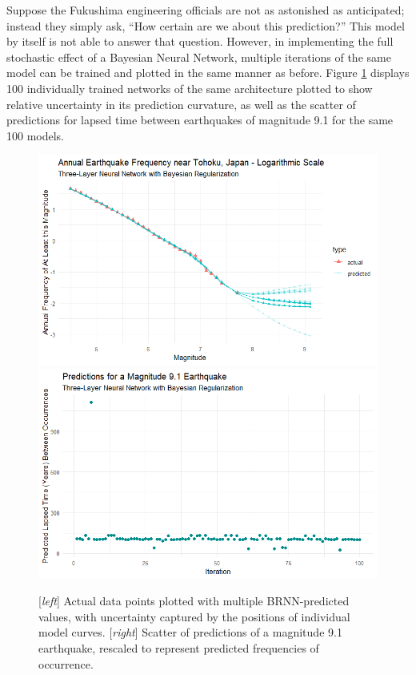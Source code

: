 Suppose the Fukushima engineering officials are not as astonished as anticipated; instead they simply ask, ``How certain are we about this prediction?''  This model by itself is not able to answer that question. 
However, in implementing the full stochastic effect of a Bayesian Neural Network, multiple iterations of the same model can be trained and plotted in the same manner as before.  Figure \ref{tohoku_brnn_uncert} displays 100 individually trained networks of the same architecture plotted to show relative uncertainty in its prediction curvature, as well as the scatter of predictions for lapsed time between earthquakes of magnitude 9.1 for the same 100 models.

\begin{figure}[H]
    \includegraphics[width=0.5\linewidth]{Figures/tohoku_logscale_brnn_uncert.png}
    \includegraphics[width=0.5\linewidth]{Figures/tohoku_9.1preds_scatter.png}
    \caption{\footnotesize{[\textit{left}] Actual data points plotted with multiple BRNN-predicted values, with uncertainty captured by the positions of individual model curves. [\textit{right}] Scatter of predictions of a magnitude 9.1 earthquake, rescaled to represent predicted frequencies of occurrence.}}
    \label{tohoku_brnn_uncert}
\end{figure}

